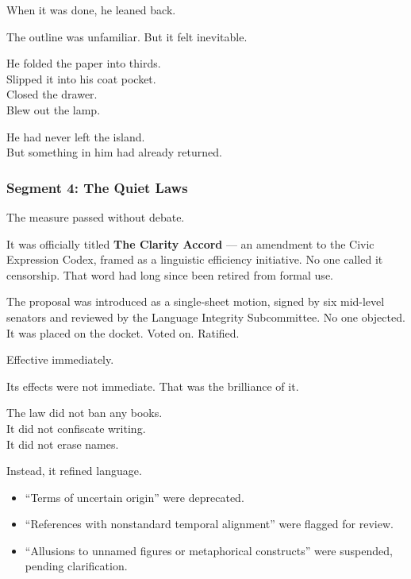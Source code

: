 \documentclass[9pt]{article}
\begin{document}
When it was done, he leaned back.

The outline was unfamiliar. But it felt inevitable.

\vspace{1em}

He folded the paper into thirds.\\
Slipped it into his coat pocket.\\
Closed the drawer.\\
Blew out the lamp.

\vspace{1em}

He had never left the island.\\
But something in him had already returned.

\newpage

\subsubsection*{Segment 4: The Quiet Laws}

The measure passed without debate.

It was officially titled \textbf{The Clarity Accord} --- an amendment to the Civic Expression Codex, framed as a linguistic efficiency initiative. No one called it censorship. That word had long since been retired from formal use.

The proposal was introduced as a single-sheet motion, signed by six mid-level senators and reviewed by the Language Integrity Subcommittee. No one objected. It was placed on the docket. Voted on. Ratified.

Effective immediately.

\vspace{1em}

Its effects were not immediate. That was the brilliance of it.

The law did not ban any books.\\
It did not confiscate writing.\\
It did not erase names.

Instead, it refined language.

\begin{itemize}
    \item “Terms of uncertain origin” were deprecated.
    \item “References with nonstandard temporal alignment” were flagged for review.
    \item “Allusions to unnamed figures or metaphorical constructs” were suspended, pending clarification.
\end{itemize}
\end{document}
